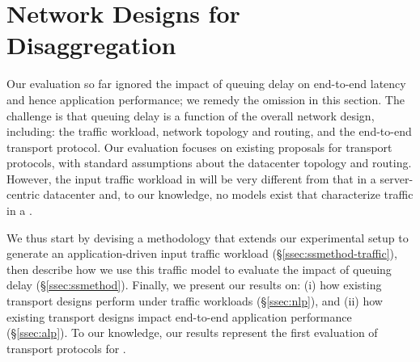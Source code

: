 \section{Network Designs for Disaggregation}
%
%
\label{sec:existing}
Our evaluation so far ignored the impact of queuing delay on end-to-end latency and hence application performance; we remedy the omission in this section.
The challenge is that queuing delay is a function of the overall network design, including: the traffic workload, network topology and routing, and the end-to-end transport protocol. Our evaluation focuses on existing proposals for transport protocols, with standard assumptions about the datacenter topology and routing. However, the input traffic workload in \dis will be very different from that in a server-centric datacenter and, to our knowledge, no models exist that characterize traffic in a \dis. 

We thus start by devising a methodology that extends our experimental setup to generate an application-driven input traffic workload (\S\ref{ssec:ssmethod-traffic}), then describe how we use this traffic model to evaluate the impact of queuing delay (\S\ref{ssec:ssmethod}). Finally, we present our results on: (i) how existing transport designs perform under \dis traffic workloads (\S\ref{ssec:nlp}), and (ii) how existing transport designs impact end-to-end application performance (\S\ref{ssec:alp}). To our knowledge, our results represent the first evaluation of transport protocols for \dis. 

